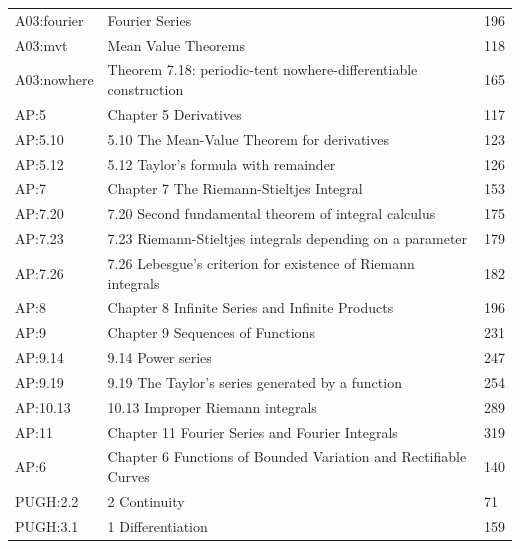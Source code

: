 \begin{longtable}{p{22mm}p{99mm}p{20mm}}
A03:fourier & Fourier Series & 196 \\

A03:mvt & Mean Value Theorems & 118 \\

A03:nowhere & Theorem 7.18: periodic-tent nowhere-differentiable construction & 165 \\

AP:5 & Chapter 5 Derivatives & 117 \\

AP:5.10 & 5.10 The Mean-Value Theorem for derivatives & 123 \\

AP:5.12 & 5.12 Taylor's formula with remainder & 126 \\

AP:7 & Chapter 7 The Riemann-Stieltjes Integral & 153 \\

AP:7.20 & 7.20 Second fundamental theorem of integral calculus & 175 \\

AP:7.23 & 7.23 Riemann-Stieltjes integrals depending on a parameter & 179 \\

AP:7.26 & 7.26 Lebesgue's criterion for existence of Riemann integrals & 182 \\

AP:8 & Chapter 8 Infinite Series and Infinite Products & 196 \\

AP:9 & Chapter 9 Sequences of Functions & 231 \\

AP:9.14 & 9.14 Power series & 247 \\

AP:9.19 & 9.19 The Taylor's series generated by a function & 254 \\

AP:10.13 & 10.13 Improper Riemann integrals & 289 \\

AP:11 & Chapter 11 Fourier Series and Fourier Integrals & 319 \\

AP:6 & Chapter 6 Functions of Bounded Variation and Rectifiable Curves & 140 \\

PUGH:2.2 & 2 Continuity & 71 \\

PUGH:3.1 & 1 Differentiation & 159 \\


\end{longtable}
